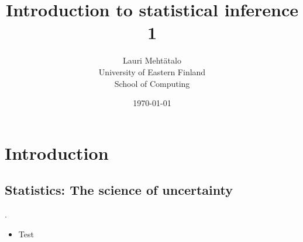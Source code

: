 \documentclass[10pt, twoside, a4paper]{book}
\theoremstyle{definition}
\begin{document}
\setlength{\baselineskip}{16pt}

\title{Introduction to statistical inference 1}

\author{Lauri Meht\"atalo\\
	   University of Eastern Finland \\ School of Computing
	   }

\date{\normalsize \today}
\maketitle
\tableofcontents



\mainmatter
{}

\chapter{Introduction}
\section{Statistics: The science of uncertainty}.
\begin{itemize}
  \item Test
\end{itemize}
\end{document}
